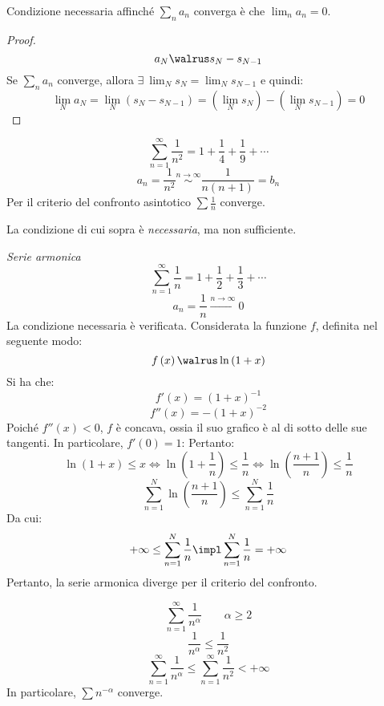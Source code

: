 \begin{theorem}
  Condizione necessaria affinché $\sum_na_n$ converga è che $\lim_na_n=0$.
\end{theorem}
\begin{proof}
  $$a_N\walrus s_N-s_{N-1}$$
  Se $\sum_na_n$ converge, allora $\exists\ \lim_Ns_N=\lim_Ns_{N-1}$ e quindi:
  $$\lim_Na_N=\lim_N\left( s_N-s_{N-1} \right)=\left( \lim_Ns_N \right)-\left( \lim_Ns_{N-1} \right)=0$$
\end{proof}

\begin{example}
  $$\sum_{n=1}^\infty\frac{1}{n^2}=1+\frac{1}{4}+\frac{1}{9}+\cdots$$
  $$a_n=\frac{1}{n^2}\stackrel{n\to\infty}{\sim}\frac{1}{n\left( n+1 \right)}=b_n$$
  Per il criterio del confronto asintotico $\sum\frac{1}{n}$ converge.
\end{example}

\begin{observation}
  La condizione di cui sopra è \emph{necessaria}, ma non sufficiente.
\end{observation}

\begin{example}
  \emph{Serie armonica}
  $$\sum_{n=1}^\infty\frac{1}{n}=1+\frac{1}{2}+\frac{1}{3}+\cdots$$
  $$a_n=\frac{1}{n}\xrightarrow{n\to\infty}0$$
  La condizione necessaria è verificata.
  Considerata la funzione $f$, definita nel seguente modo:
  $$f\left( x \right)\walrus\ln\left( 1+x \right)$$
  Si ha che:
  $$f'\left( x \right)=\left( 1+x \right)^{-1}$$
  $$f''\left( x \right)=-\left( 1+x \right)^{-2}$$
  Poiché $f''\left( x \right)<0$, $f$ è concava, ossia il suo grafico è al di sotto delle sue tangenti. In particolare, $f'\left( 0 \right)=1$:
  Pertanto:
  $$\ln\left( 1+x \right)\le x\iff\ln\left( 1+\frac{1}{n} \right)\le \frac{1}{n}\iff\ln\left( \frac{n+1}{n} \right)\le \frac{1}{n}$$
  $$\sum_{n=1}^N\ln\left( \frac{n+1}{n} \right)\le\sum_{n=1}^N\frac{1}{n}$$
  Da cui:
  $$+\infty\le\sum_{n=1}^N\frac{1}{n}\impl \sum_{n=1}^N\frac{1}{n}=+\infty$$
  Pertanto, la serie armonica diverge per il criterio del confronto.
\end{example}

\begin{example}
  $$\sum_{n=1}^\infty\frac{1}{n^\alpha}\qquad\alpha\ge2$$
  $$\frac{1}{n^\alpha}\le\frac{1}{n^2}$$
  $$\sum_{n=1}^\infty \frac{1}{n^\alpha}\le\sum_{n=1}^\infty\frac{1}{n^2}<+\infty$$
  In particolare, $\sum n^{-\alpha}$ converge.
\end{example}

